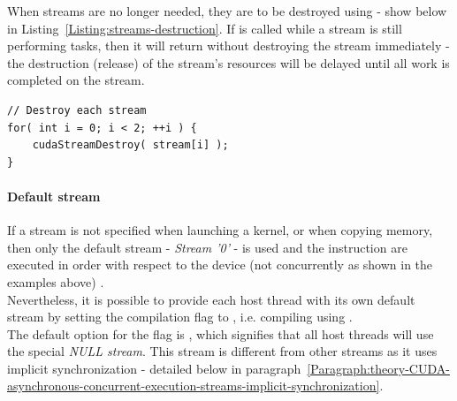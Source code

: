 When streams are no longer needed, they are to be destroyed using  - show below in Listing~\ref{Listing:streams-destruction}. If  is called while a stream is still performing tasks, then it will return without destroying the stream immediately - the destruction (release) of the stream's resources will be delayed until all work is completed on the stream.

\begin{lstlisting}[caption={Destruction of streams. Taken from Nvidia's \emph{CUDA C++ Programming Guide} \cite{NVIDIAMay2022}.},label={Listing:streams-destruction}]
// Destroy each stream
for( int i = 0; i < 2; ++i ) {
	cudaStreamDestroy( stream[i] );
}
\end{lstlisting}

\paragraph{Default stream}\label{Paragraph:theory-CUDA-asynchronous-concurrent-execution-streams-default-stream}
If a stream is not specified when launching a kernel, or when copying memory, then only the default stream - \textit{Stream '0'} - is used and the instruction are executed in order with respect to the device (not concurrently as shown in the examples above) \cite{NVIDIAMay2022}. \\
Nevertheless, it is possible to provide each host thread with its own default stream by setting the  compilation flag to , i.e. compiling using . \\
The default option for the flag is , which signifies that all host threads will use the special \textit{NULL stream}. This stream is different from other streams as it uses implicit synchronization - detailed below in paragraph~\ref{Paragraph:theory-CUDA-asynchronous-concurrent-execution-streams-implicit-synchronization}.

